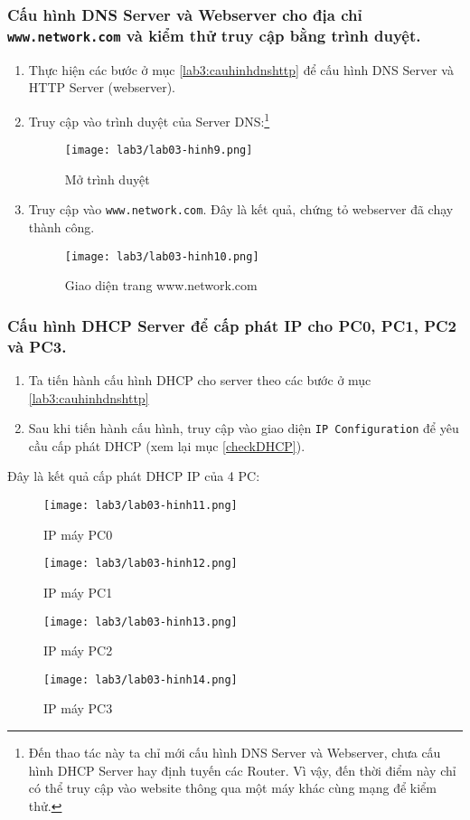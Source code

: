 \documentclass[]{article}
\begin{document}
\subsubsection{Cấu hình DNS Server và Webserver cho địa chỉ \texttt{www.network.com} và kiểm thử truy cập bằng trình duyệt.}
\begin{enumerate}
\item Thực hiện các bước ở mục \ref{lab3:cauhinhdnshttp} để cấu hình DNS Server và HTTP Server (webserver).
\item Truy cập vào trình duyệt của Server DNS:\label{browser}\footnote{Đến thao tác này ta chỉ mới cấu hình DNS Server và Webserver, chưa cấu hình DHCP Server hay định tuyến các Router. Vì vậy, đến thời điểm này chỉ có thể truy cập vào website thông qua một máy khác cùng mạng để kiểm thử.}
\begin{figure}[H]
\centering
\texttt{[image: lab3/lab03-hinh9.png]}
\caption{Mở trình duyệt}
\end{figure}
\item Truy cập vào \texttt{www.network.com}. Đây là kết quả, chứng tỏ webserver đã chạy thành công.
\begin{figure}[H]
\centering
\texttt{[image: lab3/lab03-hinh10.png]}
\caption{Giao diện trang www.network.com}
\end{figure}
\end{enumerate}
\subsubsection{Cấu hình DHCP Server để cấp phát IP cho PC0, PC1, PC2 và PC3.}\label{lab03:ketQuaDHCP}
\begin{enumerate}
\item Ta tiến hành cấu hình DHCP cho server theo các bước ở mục \ref{lab3:cauhinhdnshttp}
\item Sau khi tiến hành cấu hình, truy cập vào giao diện \texttt{IP Configuration} để yêu cầu cấp phát DHCP (xem lại mục \ref{checkDHCP}).
\end{enumerate}
Đây là kết quả cấp phát DHCP IP của 4 PC:
\begin{figure}[H]
\centering
\texttt{[image: lab3/lab03-hinh11.png]}
\caption{IP máy PC0}
\end{figure}
\begin{figure}[H]
\centering
\texttt{[image: lab3/lab03-hinh12.png]}
\caption{IP máy PC1}
\end{figure}
\begin{figure}[H]
\centering
\texttt{[image: lab3/lab03-hinh13.png]}
\caption{IP máy PC2}
\end{figure}
\begin{figure}[H]
\centering
\texttt{[image: lab3/lab03-hinh14.png]}
\caption{IP máy PC3}
\end{figure}
\end{document}
